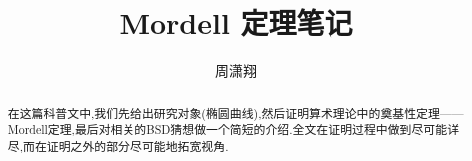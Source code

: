 \documentclass[12pt,A4paper,oneside,reqno]{amsart}
\numberwithin{equation}{section}
\theoremstyle{definition}
\theoremstyle{plain}
\theoremstyle{plain}
\numberwithin{equation}{section}
\theoremstyle{remark}
\begin{document}
\title[]{\LARGE Mordell 定理笔记}


\author[]{\large 周潇翔}
\address{School of Mathematical Sciences\\
University of Science and Technology of China\\
Hefei, 230026\\ P.R. China\\}
\maketitle
\tableofcontents



\begin{abstract}
在这篇科普文中,我们先给出研究对象(椭圆曲线),然后证明算术理论中的奠基性定理——Mordell定理,最后对相关的BSD猜想做一个简短的介绍.全文在证明过程中做到尽可能详尽,而在证明之外的部分尽可能地拓宽视角.
\end{abstract}




\end{document}
